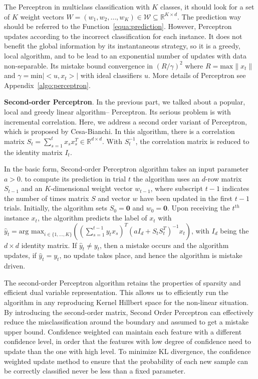 The Perceptron in multiclass classification with $K$ classes, it should look for a set of $K$ weight vectors $W = (w_1,w_2,\dots,w_K) \in \mathscr{W} \subseteq \mathbb{R}^{K\times d}$. The prediction way should be referred to the Function~\ref{equa:prediction}. However, Perceptron updates according to the incorrect classification for each instance. It does not benefit the global information by its instantaneous strategy, so it is a greedy, local algorithm, and to be lead to an exponential number of updates with data non-separable. Its mistake bound convergence in $(R/\gamma)^2$ where $R = \text{max} \parallel{x_t}\parallel$ and $\gamma = \text{min} |<u,x_t>|$ with ideal classifiers $u$. More details of Perceptron see Appendix~\ref{algo:perceptron}.

\vspace{3ex}
\textbf{Second-order Perceptron}\cite{cesa2005second}. In the previous part, we talked about a popular, local and greedy linear algorithm-- Perceptron. Its serious problem is with incremental correlation. Here, we address a second order variant of Perceptron, which is proposed by Cesa-Bianchi. In this algorithm, there is a correlation matrix $S_t = \sum_{s=1}^t x_sx_s^T \in \mathbb{R}^{d\times d}$. With $S_t^{-1}$, the correlation matrix is reduced  to the identity matrix $I_t$.  

In the basic form, Second-order Perceptron algorithm takes an input parameter $a>0$. to compute its prediction in trial $t$ the algorithm uses an $d$-row matrix $S_{t-1}$ and an $K$-dimensional weight vector $w_{t-1}$, where subscript $t-1$ indicates the number of times matrix $S$ and vector $w$ have been updated in the first $t-1$ trials. Initially, the algorithm sets $S_0 = \mathbf{0}$ and $w_0 = \mathbf{0}$. Upon receiving the $t^{th}$ instance $x_t$, the algorithm  predicts the label of $x_t$ with $\hat{y}_t = \text{arg max}_{i\in\{1,\dots,K\}} \left((\sum_{s=1}^{t-1}y_t x_s)^T (a I_d+S_tS_t^T)^{-1}x_t\right)$, with $I_d$ being the $d\times d$ identity matrix. If $\hat{y}_t\neq y_t$, then a mistake occurs and the algorithm updates, if $\hat{y}_t = y_t$, no update takes place, and hence the algorithm is mistake driven. 

The second-order Perceptron algorithm retains the properties of sparsity and efficient dual variable representation. This allows us to efficiently run the algorithm in any reproducing Kernel Hillbert space for the non-linear situation.  By introducing the second-order matrix, Second Order Perceptron can effectively reduce the misclassification around the boundary and assumed to get a mistake upper bound. Confidence weighted can maintain each feature with a different confidence level, in order that the features with low degree of confidence need to update than the one with high level. To minimize KL divergence, the confidence weighted update method to ensure that the probability of each new sample can be correctly classified never be less than a fixed parameter. 

